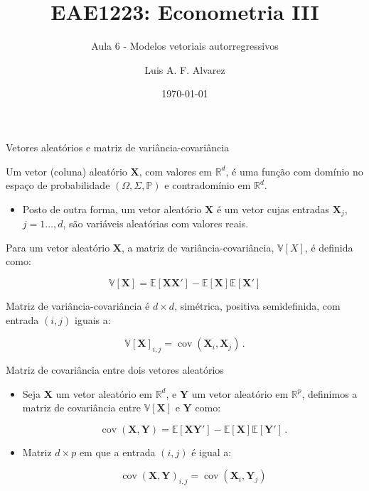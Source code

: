 \documentclass[11pt]{beamer}
\author{Luis A. F. Alvarez}
\title{EAE1223: Econometria III}
\subtitle{Aula 6 - Modelos vetoriais autorregressivos}
\date{\today}
\newenvironment{halfwideitemize}{\itemize\addtolength{\itemsep}{0.5em}}{\enditemize}
\begin{document}
\begin{frame}[plain]
	\maketitle
\end{frame}

\begin{frame}{Vetores aleatórios e matriz de variância-covariância}
\begin{halfwideitemize}
	\item Um vetor (coluna) aleatório $\boldsymbol{X}$, com valores em $\mathbb{R}^d$, é uma função com domínio no espaço de probabilidade $(\Omega,\Sigma,\mathbb{P})$ e contradomínio em $\mathbb{R}^d$.
\begin{itemize}
	\item Posto de outra forma, um vetor aleatório  $\boldsymbol{X}$ é um vetor cujas entradas $\boldsymbol{X}_j$, $j=1\ldots, d$, são variáveis aleatórias com valores reais.
\end{itemize}
\item Para um vetor aleatório $\boldsymbol{X}$, a matriz de variância-covariância, $\mathbb{V}[X]$, é definida como:

$$\mathbb{V}[\boldsymbol{X}]  = \mathbb{E}[\boldsymbol{X}\boldsymbol{X}'] - \mathbb{E}[\boldsymbol{X}]\mathbb{E}[\boldsymbol{X}']$$

\item Matriz de variância-covariância é $d \times d$, simétrica, positiva semidefinida, com entrada $(i,j)$ iguais a:

$$\mathbb{V}[\boldsymbol{X}]_{i,j}= \operatorname{cov}(\boldsymbol{X}_i,\boldsymbol{X}_j)\, .$$

\end{halfwideitemize}
\end{frame}

\begin{frame}{Matriz de covariância entre dois vetores aleatórios}
	\begin{itemize}
		\item Seja $\boldsymbol{X}$ um vetor aleatório em $\mathbb{R}^d$, e $\boldsymbol{Y}$ um vetor aleatório em $\mathbb{R}^p$, definimos a matriz de covariância entre $\mathbb{V}[\boldsymbol{X}]$ e $\boldsymbol{Y}$  como:
		
		$$\operatorname{cov}(\boldsymbol{X},\boldsymbol{Y}) = \mathbb{E}[\boldsymbol{X}\boldsymbol{Y}'] - \mathbb{E}[\boldsymbol{X}]\mathbb{E}[\boldsymbol{Y}'] \, .$$
		\item Matriz $d \times p$ em que a entrada $(i,j)$ é igual a:
		
		$$\operatorname{cov}(\boldsymbol{X},\boldsymbol{Y})_{i,j} = \operatorname{cov}(\boldsymbol{X}_i,\boldsymbol{Y}_j)$$
	\end{itemize}
\end{frame}
\end{document}
